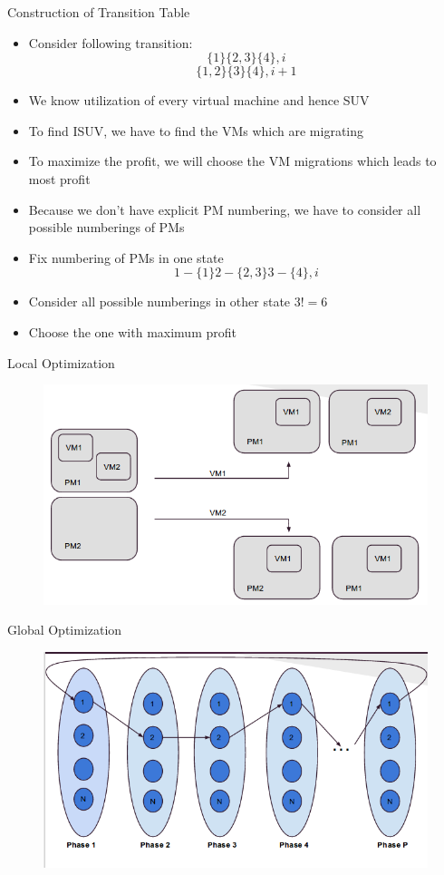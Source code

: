 \documentclass{beamer}
\begin{document}
\begin{frame}{Construction of Transition Table}
\begin{itemize}
\item Consider following transition: \\
    \[\{1\}\{2, 3\}\{4\}, i\] \[\{1,2\}\{3\}\{4\}, i+1\]
\item We know utilization of every virtual machine and hence SUV
\item To find ISUV, we have to find the VMs which are migrating
\item To maximize the profit, we will choose the VM migrations which leads to most profit
\item Because we don't have explicit PM numbering, we have to consider all possible numberings of PMs
\item Fix numbering of PMs in one state\\
\[1-\{1\} 2-\{2,3\} 3-\{4\}, i\]
\item Consider all possible numberings in other state $3! = 6$
\item Choose the one with maximum profit
\end{itemize}
\end{frame}

\begin{frame}{Local Optimization}
\begin{figure}
\includegraphics[scale=0.5]{images/lo}
\end{figure}
\end{frame}

\begin{frame}{Global Optimization}
\begin{figure}
\includegraphics[scale=0.5]{images/go}
\end{figure}
\end{frame}
\end{document}
